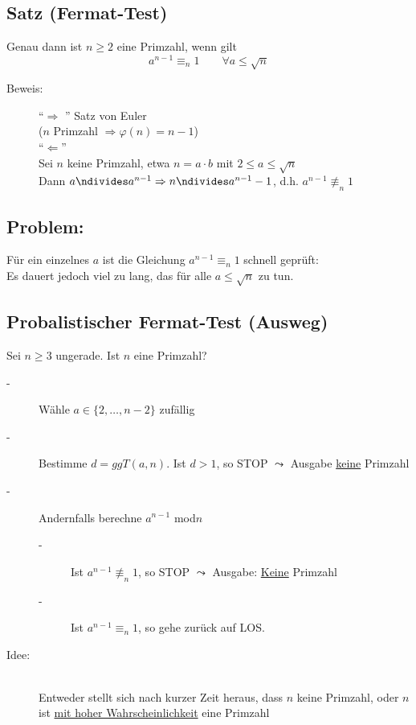 \subsection{Satz (Fermat-Test)}
Genau dann ist $n \geq 2$ eine Primzahl, wenn gilt
\begin{equation*}
	a^{n-1} \equiv_{n} 1 \qquad \forall a \leq \sqrt{n}
\end{equation*}
\begin{description}
	\item[Beweis:] "`$\Rightarrow$ "' Satz von Euler\\
				($n$ Primzahl $\Rightarrow \varphi(n) = n - 1$)\\
				"`$\Leftarrow$"' \\
				Sei $n$ keine Primzahl, etwa $n = a \cdot b$ mit $2 \leq a \leq \sqrt{n}$\\
				Dann $a \ndivides a^{n-1} \Rightarrow n \ndivides a^{n-1} - 1$, d.h. $a^{n-1} \nequiv_{n} 1$
\end{description}
%
%
%
\subsection{Problem:}
Für ein einzelnes $a$ ist die Gleichung $a^{n-1}\equiv_{n} 1$ schnell geprüft:\\
Es dauert jedoch viel zu lang, das für alle $a \leq \sqrt{n}$ zu tun. 
%
%
%
\subsection{Probalistischer Fermat-Test (Ausweg)}
Sei $n \geq 3$ ungerade. Ist $n$ eine Primzahl? 
\begin{description}
	\item[-] Wähle $a \in \{2, \dotsc, n-2\}$ zufällig
	\item[-] Bestimme $d = ggT(a,n)$. Ist $d > 1$, so STOP $\leadsto$ Ausgabe \underline{keine} Primzahl
	\item[-] Andernfalls berechne $a^{n-1}$ mod$n$
	\begin{description}
		\item[-] Ist $a^{n-1} \nequiv_{n} 1$, so STOP $\leadsto$ Ausgabe: \underline{Keine} Primzahl
		\item[-] Ist $a^{n-1} \equiv_{n} 1$, so gehe zurück auf LOS.
	\end{description}
	\item[Idee:]\quad\\
			Entweder stellt sich nach kurzer Zeit heraus, dass $n$ keine Primzahl, oder $n$ ist \underline{mit hoher Wahrscheinlichkeit} eine Primzahl
\end{description}
%
%
%
